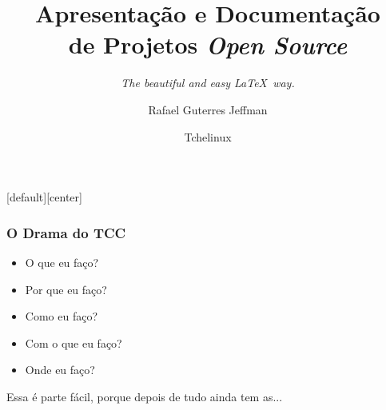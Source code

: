 


\title[]{Apresentação e Documentação \\ de Projetos \emph{Open Source}}
\subtitle[]{\emph{The beautiful and easy \LaTeX\ way.}}
\author[]{Rafael Guterres Jeffman}
\institute[]{}
\date{Tchelinux}


\hypersetup{pdfpagemode=FullScreen}

\beamertemplatenavigationsymbolsempty

[default][center]




\begin{frame}
    \titlepage
\end{frame}

\begin{frame}[c]
    \frametitle{O Drama do TCC}
    \begin{itemize}
    \item{O que eu faço?}
    \item{Por que eu faço?}
    \item{Como eu faço?}
    \item{Com o que eu faço?}
    \item{Onde eu faço?}
    \end{itemize}
\end{frame}

\begin{frame}
    \vfill
    \begin{center}
    \large Essa é parte fácil, porque depois de tudo ainda tem as...
    \end{center}
\end{frame}

